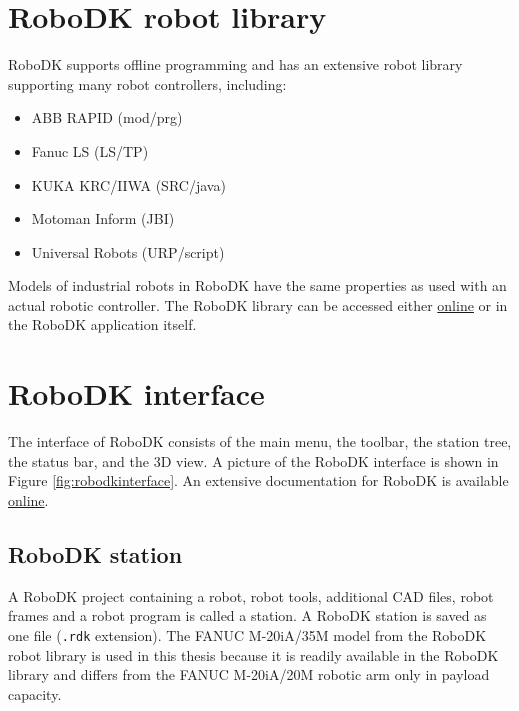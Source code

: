 \section{RoboDK robot library}

RoboDK supports offline programming and has an extensive robot library supporting many robot controllers, including:

\begin{itemize}
    \item ABB RAPID (mod/prg)
    \item Fanuc LS (LS/TP)
    \item KUKA KRC/IIWA (SRC/java)
    \item Motoman Inform (JBI)
    \item Universal Robots (URP/script)
\end{itemize}
Models of industrial robots in RoboDK have the same properties as used with an actual robotic controller. The RoboDK library can be accessed either \href{https://en.etsmtl.ca/unites-de-recherche/coro/accueil?lang=en-CA}{online}  or in the RoboDK application itself. 



\section{RoboDK interface}

The interface of RoboDK consists of the main menu, the toolbar, the station tree, the status bar, and the 3D view. A picture of the RoboDK interface is shown in Figure \ref{fig:robodkinterface}. An extensive documentation for RoboDK is available \href{https://robodk.com/doc/en/Basic-Guide.html#Start}{online}.

\subsection{RoboDK station}

A RoboDK project containing a robot, robot tools, additional CAD files, robot frames and a robot program is called a station. A RoboDK station is saved as one file (\texttt{.rdk} extension).  The FANUC M-20iA/35M model from the RoboDK robot library is used in this thesis because it is readily available in the RoboDK library and differs from the FANUC M-20iA/20M robotic arm only in payload capacity.

